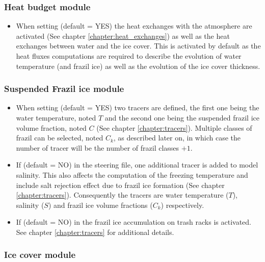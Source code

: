 \subsubsection{Heat budget module}


\begin{itemize}
    \item When setting  (default = YES) the heat exchanges with the atmosphere
are activated (See chapter \ref{chapter:heat_exchanges}) as well as the heat exchanges between
water and the ice cover. This is activated by default as
the heat fluxes computations are required to describe the evolution of water
temperature (and frazil ice) as well as the evolution of the ice cover thickness.
\end{itemize}

\subsubsection{Suspended Frazil ice module}
\begin{itemize}
    \item When setting  (default = YES) two tracers are defined, the first one being
the water temperature, noted $T$ and the second one being the suspended frazil ice volume fraction, noted $C$
 (See chapter \ref{chapter:tracers}).
Multiple classes of frazil can be selected, noted $C_k$, as described later on, in which case the number of tracer will
be the number of frazil classes $+1$.
    \item If  (default = NO) in the \khione steering file, one additional tracer
is added to model salinity. This also affects the computation of the freezing temperature and include
salt rejection effect due to frazil ice formation (See chapter \ref{chapter:tracers}).
Consequently the tracers are water temperature ($T$), salinity ($S$) and frazil ice volume fractions ($C_k$)
respectively.
    \item If  (default = NO) in the frazil ice accumulation on trash racks is activated.
See chapter \ref{chapter:tracers} for additional details.
\end{itemize}

\subsubsection{Ice cover module}

